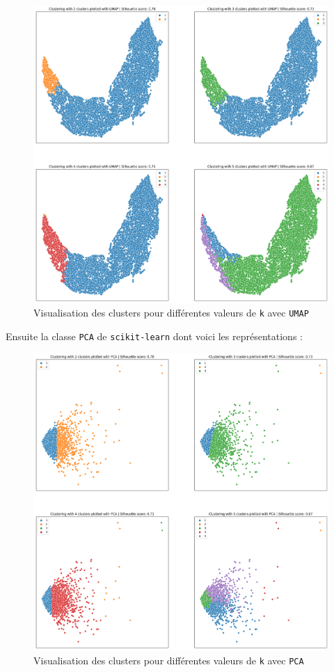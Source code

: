 \documentclass{article}
\begin{document}
\begin{figure}[ht]
  \centering
  \includegraphics[width=1\textwidth]{img/clustering_umap.png}
  \caption{Visualisation des clusters pour différentes valeurs de \texttt{k} avec \texttt{UMAP}}
\end{figure}
\newpage

Ensuite la classe \texttt{PCA} de \texttt{scikit-learn} dont voici les représentations :

\begin{figure}[ht]
  \centering
  \includegraphics[width=1\textwidth]{img/clustering_PCA.png}
  \caption{Visualisation des clusters pour différentes valeurs de \texttt{k} avec \texttt{PCA}}
\end{figure}
\newpage
\end{document}
